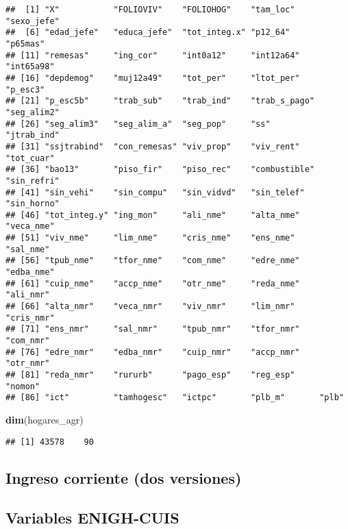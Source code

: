 \documentclass[11pt,]{article}
\newenvironment{Shaded}{\begin{snugshade}}{\end{snugshade}}
\newcommand{\KeywordTok}[1]{\textcolor[rgb]{0.13,0.29,0.53}{\textbf{#1}}}
\newcommand{\NormalTok}[1]{#1}
\begin{document}
\begin{verbatim}
##  [1] "X"           "FOLIOVIV"    "FOLIOHOG"    "tam_loc"     "sexo_jefe"  
##  [6] "edad_jefe"   "educa_jefe"  "tot_integ.x" "p12_64"      "p65mas"     
## [11] "remesas"     "ing_cor"     "int0a12"     "int12a64"    "int65a98"   
## [16] "depdemog"    "muj12a49"    "tot_per"     "ltot_per"    "p_esc3"     
## [21] "p_esc5b"     "trab_sub"    "trab_ind"    "trab_s_pago" "seg_alim2"  
## [26] "seg_alim3"   "seg_alim_a"  "seg_pop"     "ss"          "jtrab_ind"  
## [31] "ssjtrabind"  "con_remesas" "viv_prop"    "viv_rent"    "tot_cuar"   
## [36] "bao13"       "piso_fir"    "piso_rec"    "combustible" "sin_refri"  
## [41] "sin_vehi"    "sin_compu"   "sin_vidvd"   "sin_telef"   "sin_horno"  
## [46] "tot_integ.y" "ing_mon"     "ali_nme"     "alta_nme"    "veca_nme"   
## [51] "viv_nme"     "lim_nme"     "cris_nme"    "ens_nme"     "sal_nme"    
## [56] "tpub_nme"    "tfor_nme"    "com_nme"     "edre_nme"    "edba_nme"   
## [61] "cuip_nme"    "accp_nme"    "otr_nme"     "reda_nme"    "ali_nmr"    
## [66] "alta_nmr"    "veca_nmr"    "viv_nmr"     "lim_nmr"     "cris_nmr"   
## [71] "ens_nmr"     "sal_nmr"     "tpub_nmr"    "tfor_nmr"    "com_nmr"    
## [76] "edre_nmr"    "edba_nmr"    "cuip_nmr"    "accp_nmr"    "otr_nmr"    
## [81] "reda_nmr"    "rururb"      "pago_esp"    "reg_esp"     "nomon"      
## [86] "ict"         "tamhogesc"   "ictpc"       "plb_m"       "plb"
\end{verbatim}

\begin{Shaded}
\begin{Highlighting}[]
\KeywordTok{dim}\NormalTok{(hogares_agr)}
\end{Highlighting}
\end{Shaded}

\begin{verbatim}
## [1] 43578    90
\end{verbatim}

\subsection{Ingreso corriente (dos
versiones)}\label{ingreso-corriente-dos-versiones}

\subsection{Variables ENIGH-CUIS}\label{variables-enigh-cuis}
\end{document}
